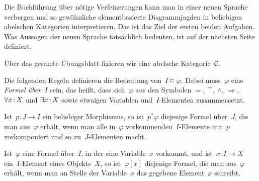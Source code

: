 \documentclass{uebblatt}
\begin{document}
Die Buchführung über nötige Verfeinerungen kann man in einer neuen Sprache
verbergen und so gewöhnliche elementbasierte Diagrammjagden in beliebigen
abelschen Kategorien interpretieren. Das ist das Ziel der ersten beiden
Aufgaben. Was Aussagen der neuen Sprache tatsächlich bedeuten, ist auf der
nächsten Seite definiert.

Über das gesamte Übungsblatt fixieren wir eine abelsche Kategorie~$\mathcal{C}$.

\newpage

Die folgenden Regeln definieren die Bedeutung von~$I \models \varphi$.
Dabei muss~$\varphi$ eine \emph{Formel über~$I$} sein, das heißt, dass
sich~$\varphi$ aus den Symbolen $=$, $\top$, $\wedge$, $\Rightarrow$,
$\forall x\,{:}\,X$ und $\exists x\,{:}\,X$
sowie etwaigen Variablen und~$I$-Elementen zusammensetzt.

Ist~$p : J \to I$ ein beliebiger Morphismus, so ist~$p^*\varphi$ diejenige
Formel über~$J$, die man aus~$\varphi$ erhält, wenn man alle in~$\varphi$
vorkommenden~$I$-Elemente mit~$p$ vorkomponiert und so zu~$J$-Elementen
macht.

Ist~$\varphi$ eine Formel über~$I$, in der eine Variable~$x$ vorkommt, und
ist~$x : I \to X$ ein~$I$-Element eines Objekts~$X$, so ist~$\varphi[x]$
diejenige Formel, die man aus~$\varphi$ erhält, wenn man an Stelle der
Variable~$x$ das gegebene Element~$x$ schreibt.
\begin{center}\end{center}
\vspace{\aufgabenskip}
\end{document}
